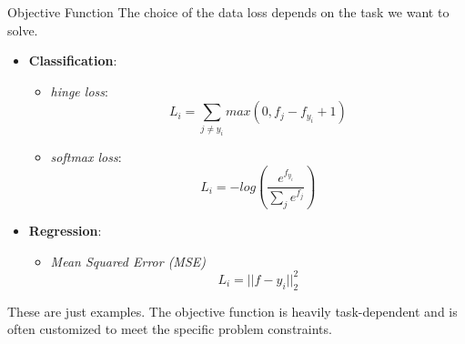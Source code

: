 \documentclass[aspectratio=169]{beamer}
\begin{document}
\begin{frame}{Objective Function}
The choice of the data loss depends on the task we want to solve.
\begin{itemize}
	\item \textbf{Classification}:
	\begin{itemize}
		\item \emph{hinge loss}:
		\begin{equation}
		L_i = \sum_{j\neq y_i}max(0, f_j - f_{y_i} + 1)
		\end{equation}
		\item \emph{softmax loss}:
		\begin{equation}
		L_i = -log\left(\frac{e^{f_{y_i}}}{\sum_j e^{f_j}}\right)
		\end{equation}
	\end{itemize}
	\item \textbf{Regression}:
	\begin{itemize}
		\item \emph{Mean Squared Error (MSE)}
		\begin{equation}
		L_i = || f - y_i ||^2_2
		\end{equation}
	\end{itemize}
\end{itemize}
These are just examples. The objective function is heavily task-dependent and is often customized to meet the specific problem constraints.
\end{frame}

\end{document}
